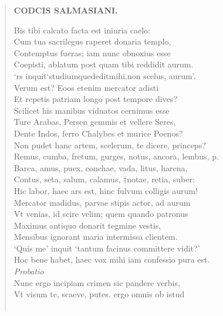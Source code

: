 \documentclass[11pt, a4paper]{report}
\begin{document}
\begin{verse}
    \begin{center} \textbf{CODCIS SALMASIANI.} \end{center} \marginpar{[89]} Bis tibi calcato facta est iniuria caelo: \\ Cum tua sacrilegus raperet donaria templo, \\ Contemptus fueras; iam nunc obnoxius esse \\ Coepisti, ablatum post \lbrack quam \rbrack  tibi reddidit aurum. \\ ‘rs inquit‘studiumquededitmihi,non scelus, aurum’. \\ Verum est? Eoos etenim mercator adisti \\ Et repetis patriam longo post tempore dives? \\ Scilicet his manibus viduatos cernimus esse \\ Ture Arabas, Persen gemmis et vellere Seres, \\ Dente Indos, ferro Chalybes et murice Poenos? \\ Non pudet hanc artem, scelerum,  \lbrack te \rbrack  dicere, princeps? \\ Remus, cumba, fretum, gurges, notus, ancora, lembus, p. \\ Barca, amus, puex, conchae, vada, litus, harena, \\ Contus, seta, salum, calamus, †notae, retia, suber: \\ Hic labor, haec ars est, hinc fulvum colligis aurum! \\ Mercator madidus, parvae stipis actor, ad aurum \\ Vt venias,  \lbrack id \rbrack  scire velim; quem quando patronus \\ Maximus antiquo donarit tegmine vestis, \\ Mensibus ignorant maria intermissa clientem. \\ ‘Quis me’ inquit ‘tantum facinus committere vidit?’ \\ Hoc bene habet, haec vox mihi  \lbrack iam confessio pura est. \\ \textit{ \lbrack Probatio \rbrack } \\ Nunc ergo incipiam crimen sic pandere verbis, \\ Vt visum te, scaeve, putes. ergo omnis ob istud \\ 
        ﻿\pagebreak 

\end{verse}
\end{document}
